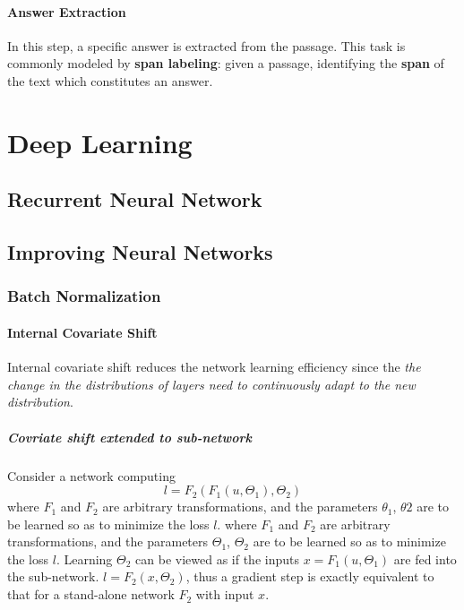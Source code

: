 \documentclass[a3paper, 12pt]{book} %
\begin{document}
\subsection{Answer Extraction}
In this step, a specific answer is extracted from the passage. This task is commonly modeled by \textbf{span labeling}: given a passage, identifying the \textbf{span} of the text which constitutes an answer.


\part{Deep Learning}

\chapter{Recurrent Neural Network}

\chapter{Improving Neural Networks}
\section{Batch Normalization}
\subsection{Internal Covariate Shift}
Internal covariate shift reduces the network learning efficiency since the \emph{the change in the distributions of layers need to continuously adapt to the new distribution}.

\subsubsection{Covriate shift extended to sub-network}
Consider a network computing 
$$l=F_2{(F_1{(u,\Theta_1)},\Theta_2)}$$
where $F_1$ and $F_2$ are arbitrary transformations, and the
parameters $\theta_1$, $\theta2$ are to be learned so as to minimize
the loss $l$.
where $F_1$ and $F_2$ are arbitrary transformations, and the parameters $\Theta_1$, $\Theta_2$ are to be learned so as to minimize the loss $l$. Learning $\Theta_2$ can be viewed as if the inputs $x=F_1{(u,\Theta_1)}$ are fed into the sub-network. $l=F_2{(x, \Theta_2)}$, thus a gradient step is exactly equivalent to that for a stand-alone network $F_2$ with input $x$. 
\end{document}
